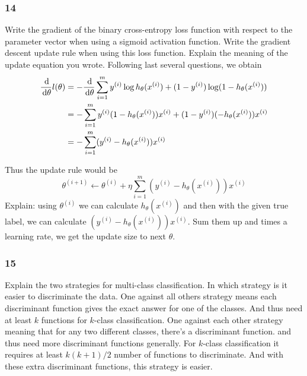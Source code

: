 \documentclass{article}
\begin{document}
\subsubsection*{14}
\begin{myleftlinebox}
    Write the gradient of the binary cross-entropy loss function with respect to the parameter vector when using a sigmoid activation function. Write the gradient descent update rule when using this loss function. Explain the meaning of the update equation you wrote.
    \tcblower
    Following last several questions, we obtain
    \begin{equation*}
        \begin{split}
            \frac{\,\mathrm{d}}{\,\mathrm{d} \theta} l(\theta) &= -\frac{\,\mathrm{d}}{\,\mathrm{d} \theta} \sum_{i=1}^m y^{(i)}\log h_\theta(x^{(i)})+(1-y^{(i)})\log (1-h_\theta(x^{(i)}))\\
            &= - \sum_{i=1}^m y^{(i)} (1-h_\theta(x^{(i)}))x^{(i)}+(1-y^{(i)})(-h_\theta(x^{(i)}))x^{(i)}\\
            &= -\sum_{i=1}^m (y^{(i)}-h_\theta(x^{(i)}))x^{(i)}
        \end{split}
    \end{equation*}

    Thus the update rule would be
    \[
        \theta^{(i+1)}\gets \theta^{(i)}+\eta \sum_{i=1}^m (y^{(i)}-h_\theta(x^{(i)}))x^{(i)}
    \]
    Explain: using \(\theta^{(i)}\) we can calculate \(h_\theta(x^{(i)})\) and then with the given true label, we can calculate \((y^{(i)}-h_\theta(x^{(i)}))x^{(i)}\). Sum them up and times a learning rate, we get the update size to next \(\theta\).
\end{myleftlinebox}

\subsubsection*{15}
\begin{myleftlinebox}
    Explain the two strategies for multi-class classification. In which strategy is it easier to discriminate the data.
    \tcblower
    One against all others strategy means each discriminant function gives the exact answer for one of the classes. And thus need at least \(k\) functions for \(k\)-class classification. One against each other strategy meaning that for any two different classes, there's a discriminant function. and thus need more discriminant functions generally. For \(k\)-class classification it requires at least \(k(k+1)/2\) number of functions to discriminate. And with these extra discriminant functions, this strategy is easier.
\end{myleftlinebox}
\end{document}
